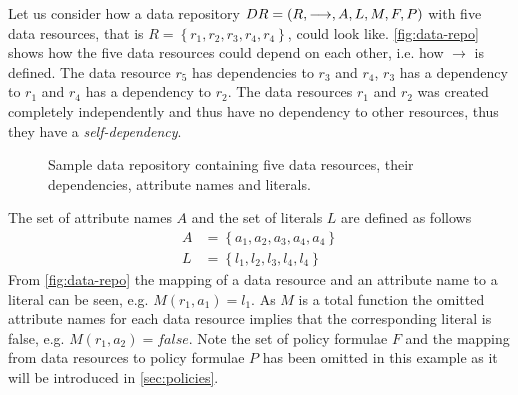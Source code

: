 \begin{example}\label{ex:data-repo}
Let us consider how a data repository $DR= \left( R, \longrightarrow, A, L, M, F, P \right)$ with five data resources, that is $R = \left\{ r_1, r_2, r_3, r_4, r_4 \right\}$, could look like. \autoref{fig:data-repo} shows how the five data resources could depend on each other, i.e. how $\longrightarrow$ is defined. The data resource $r_5$ has dependencies to $r_3$ and $r_4$, $r_3$ has a dependency to $r_1$ and $r_4$ has a dependency to $r_2$. The data resources $r_1$ and $r_2$ was created completely independently and thus have no dependency to other resources, thus they have a \emph{self-dependency}.
\begin{figure}[!ht] 
    \begin{center}
        
        \caption{Sample data repository containing five data resources, their dependencies, attribute names and literals.}
        \label{fig:data-repo}
    \end{center}
\end{figure}
The set of attribute names $A$ and the set of literals $L$ are defined as follows
\begin{align*}
    A &= \left\{ a_1, a_2, a_3, a_4, a_4 \right\} \\
    L &= \left\{ l_1, l_2, l_3, l_4, l_4 \right\}
\end{align*}
From \autoref{fig:data-repo} the mapping of a data resource and an attribute name to a literal can be seen, e.g. $M(r_1, a_1) = l_1$. As $M$ is a total function the omitted attribute names for each data resource implies that the corresponding literal is false, e.g. $M(r_1, a_2) = false$. Note the set of policy formulae $F$ and the mapping from data resources to policy formulae $P$ has been omitted in this example as it will be introduced in \autoref{sec:policies}.
\end{example}

